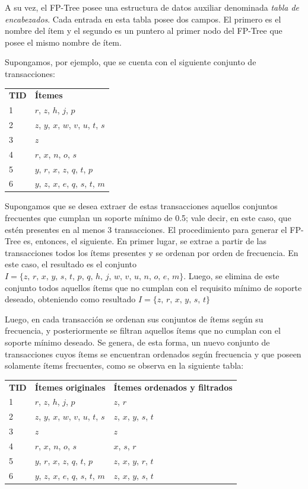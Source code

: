 A su vez, el FP-Tree posee una estructura de datos auxiliar denominada \textit{tabla de encabezados}. Cada entrada en esta tabla posee dos campos. El primero es el nombre del ítem y el segundo es un puntero al primer nodo del FP-Tree que posee el mismo nombre de ítem.

Supongamos, por ejemplo, que se cuenta con el siguiente conjunto de transacciones:

\begin{tabular}{l l}
\textbf{TID} & \textbf{Ítemes} \\
1 & $r$, $z$, $h$, $j$, $p$ \\
2 & $z$, $y$, $x$, $w$, $v$, $u$, $t$, $s$ \\
3 & $z$ \\
4 & $r$, $x$, $n$, $o$, $s$ \\
5 & $y$, $r$, $x$, $z$, $q$, $t$, $p$ \\
6 & $y$, $z$, $x$, $e$, $q$, $s$, $t$, $m$ \\
\end{tabular}

Supongamos que se desea extraer de estas transacciones aquellos conjuntos frecuentes que cumplan un soporte mínimo de 0.5; vale decir, en este caso, que estén presentes en al menos 3 transacciones. El procedimiento para generar el FP-Tree es, entonces, el siguiente. En primer lugar, se extrae a partir de las transacciones todos los ítems presentes y se ordenan por orden de frecuencia. En este caso, el resultado es el conjunto $I = \{z, \, r, \, x, \, y, \, s, \, t, \, p, \, q, \, h, \, j, \, w, \, v, \, u, \, n, \, o, \, e, \, m\}$. Luego, se elimina de este conjunto todos aquellos ítems que no cumplan con el requisito mínimo de soporte deseado, obteniendo como resultado $I = \{z, \, r, \, x, \, y, \, s, \, t\}$

Luego, en cada transacción se ordenan sus conjuntos de ítems según su frecuencia, y posteriormente se filtran aquellos ítems que no cumplan con el soporte mínimo deseado. Se genera, de esta forma, un nuevo conjunto de transacciones cuyos ítems se encuentran ordenados según frecuencia y que poseen solamente ítems frecuentes, como se observa en la siguiente tabla:

\begin{tabular}{l l l}
\textbf{TID} & \textbf{Ítemes originales} & \textbf{Ítemes ordenados y filtrados} \\
1 & $r$, $z$, $h$, $j$, $p$ & $z$, $r$ \\
2 & $z$, $y$, $x$, $w$, $v$, $u$, $t$, $s$ & $z$, $x$, $y$, $s$, $t$ \\
3 & $z$ & $z$ \\
4 & $r$, $x$, $n$, $o$, $s$ & $x$, $s$, $r$ \\
5 & $y$, $r$, $x$, $z$, $q$, $t$, $p$ & $z$, $x$, $y$, $r$, $t$ \\
6 & $y$, $z$, $x$, $e$, $q$, $s$, $t$, $m$ & $z$, $x$, $y$, $s$, $t$ \\
\end{tabular}

